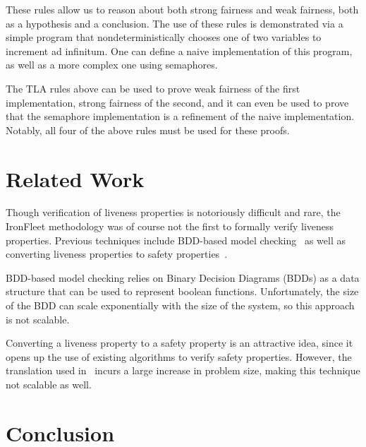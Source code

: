 \documentclass{llncs}
\begin{document}
These rules allow us to reason about both strong fairness and weak fairness,
both as a hypothesis and a conclusion. The use of these rules is demonstrated
via a simple program that nondeterministically chooses one of two variables to
increment ad infinitum. One can define a naive implementation of this program,
as well as a more complex one using semaphores.

The TLA rules above can be used to prove weak fairness of the first
implementation, strong fairness of the second, and it can even be used to prove
that the semaphore implementation is a refinement of the naive implementation.
Notably, all four of the above rules must be used for these proofs.


\section{Related Work}\label{sec:rel-work}
Though verification of liveness properties is notoriously difficult and rare,
the IronFleet methodology was of course not the first to formally verify
liveness properties. Previous techniques include BDD-based model
checking~\cite{Ravi2000} as well as converting liveness properties to safety
properties~\cite{Schuppan2006}.

BDD-based model checking relies on Binary Decision Diagrams (BDDs) as a data
structure that can be used to represent boolean functions. Unfortunately, the
size of the BDD can scale exponentially with the size of the system, so this
approach is not scalable.

Converting a liveness property to a safety property is an attractive idea, since
it opens up the use of existing algorithms to verify safety properties. However,
the translation used in~\cite{Schuppan2006} incurs a large increase in problem
size, making this technique not scalable as well.

\section{Conclusion}

%
%



\end{document}
